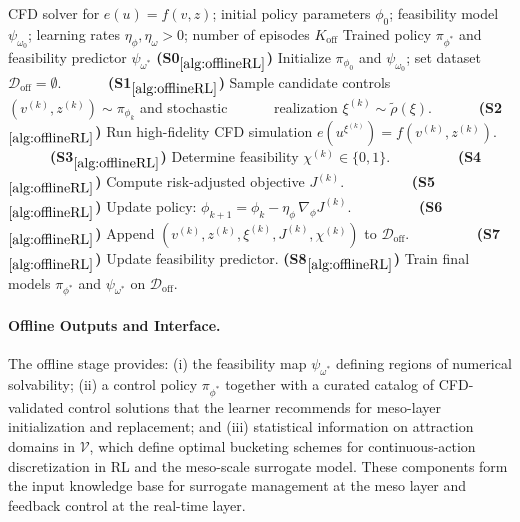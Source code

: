 \documentclass{article}
\newcommand{\1}{\mathds{1}}          %
\def\spc{~~~}
\theoremstyle{definition}
\begin{document}
\begin{sloppypar}
\begin{algorithm}[H]
\caption{Offline RL with High-Fidelity CFD Evaluations}
\label{alg:offlineRL}
\begin{algorithmic}
\Require CFD solver for $e(u)=f(v,z)$; initial policy parameters $\phi_0$; feasibility model $\psi_{\omega_0}$; learning rates $\eta_{\phi},\eta_{\omega}>0$; number of episodes $K_{\mathrm{off}}$
\Ensure Trained policy $\pi_{\phi^{*}}$ and feasibility predictor $\psi_{\omega^{*}}$
\Statex \textbf{(S0$_{\ref{alg:offlineRL}}$)} Initialize $\pi_{\phi_0}$ and $\psi_{\omega_0}$; set dataset $\mathcal{D}_{\mathrm{off}}=\emptyset$.
\Statex \spc \spc \textbf{(S1$_{\ref{alg:offlineRL}}$)} Sample candidate controls $(v^{(k)},z^{(k)})\sim\pi_{\phi_k}$ and stochastic 
\Statex \spc \spc realization $\xi^{(k)}\sim\tilde{\rho}(\xi)$.
\Statex \spc \spc \textbf{(S2$_{\ref{alg:offlineRL}}$)} Run high-fidelity CFD simulation $e(u^{\xi^{(k)}})=f(v^{(k)},z^{(k)})$.
\Statex \spc \spc \textbf{(S3$_{\ref{alg:offlineRL}}$)} Determine feasibility $\chi^{(k)}\in\{0,1\}$.
\Statex \spc \spc \spc \textbf{(S4$_{\ref{alg:offlineRL}}$)} Compute risk-adjusted objective $J^{(k)}$.
\Statex \spc \spc \spc \textbf{(S5$_{\ref{alg:offlineRL}}$)} Update policy: $\phi_{k+1}=\phi_k-\eta_{\phi}\,\nabla_{\phi}J^{(k)}$.
\Statex \spc \spc \spc \textbf{(S6$_{\ref{alg:offlineRL}}$)} Append $(v^{(k)},z^{(k)},\xi^{(k)},J^{(k)},\chi^{(k)})$ to $\mathcal{D}_{\mathrm{off}}$.
\Else
\Statex \spc \spc \spc \textbf{(S7$_{\ref{alg:offlineRL}}$)} Update feasibility predictor.
\EndIf
\EndFor
\Statex \textbf{(S8$_{\ref{alg:offlineRL}}$)} Train final models $\pi_{\phi^{*}}$ and $\psi_{\omega^{*}}$ on $\mathcal{D}_{\mathrm{off}}$.
\end{algorithmic}
\end{algorithm}

\paragraph{Offline Outputs and Interface.}
The offline stage provides: (i) the feasibility map $\psi_{\omega^{*}}$ defining regions of numerical solvability; (ii) a control policy $\pi_{\phi^{*}}$ together with a curated catalog of CFD-validated control solutions that the learner recommends for meso-layer initialization and replacement; and (iii) statistical information on attraction domains in $\mathcal{V}$, which define optimal bucketing schemes for continuous-action discretization in RL and the meso-scale surrogate model. These components form the input knowledge base for surrogate management at the meso layer and feedback control at the real-time layer.



\end{sloppypar}
\end{document}
